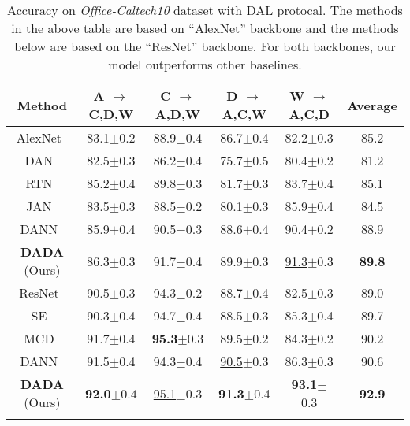 \documentclass{article}
\begin{document}
\begin{table*}[t]

    \addtolength{\tabcolsep}{1pt}
    \caption{Accuracy on \emph{Office-Caltech10} dataset with DAL protocal. The methods in the above table are based on ``AlexNet'' backbone and the methods below are based on the ``ResNet'' backbone. For both backbones, our model outperforms other baselines. } \label{table_office}
    \vspace{0.1in}
    \centering
    
    \label{table:office10}
    \begin{tabular}{cccccc}
        \Xhline{1pt}
        Method & A $\rightarrow$ C,D,W & C $\rightarrow$ A,D,W & D $\rightarrow$ A,C,W & W $\rightarrow$ A,C,D & Average \\
        \hline
        AlexNet~\cite{alexnet}& 83.1$\pm$0.2 & 88.9$\pm$0.4 & 86.7$\pm$0.4  & 82.2$\pm$0.3& 85.2 \\
        DAN~\cite{long2015} & 82.5$\pm$0.3 & 86.2$\pm$0.4& 75.7$\pm$0.5& 80.4$\pm$0.2 & 81.2 \\
        
        RTN~\cite{RTN} & 85.2$\pm$0.4 & 89.8$\pm$0.3 & 81.7$\pm$0.3& 83.7$\pm$0.4 & 85.1 \\
        JAN~\cite{JAN} & 83.5$\pm$0.3& 88.5$\pm$0.2 & 80.1$\pm$0.3& 85.9$\pm$0.4 & 84.5 \\
        DANN~\cite{DANN} & 85.9$\pm$0.4 & 90.5$\pm$0.3 & 88.6$\pm0.4$& 90.4$\pm$0.2& 88.9  \\
        \textbf{DADA} (Ours) & 86.3$\pm$0.3 &91.7$\pm$0.4 & 89.9$\pm$0.3 & \underline{91.3}$\pm$0.3 & \textbf{89.8}\\
        \Xhline{1pt}
        ResNet~\cite{resnet} & 90.5$\pm$0.3 & 94.3$\pm$0.2 & 88.7$\pm$0.4 &82.5$\pm$0.3 & 89.0\\
        SE~\cite{SE} & 90.3$\pm$0.4 & 94.7$\pm$0.4 & 88.5$\pm$0.3 & 85.3$\pm$0.4 & 89.7 \\
        MCD~\cite{MCD_2018} & 91.7$\pm$0.4 &\textbf{95.3}$\pm$0.3 & 89.5$\pm$0.2 & 84.3$\pm$0.2  & 90.2 \\ 
        DANN~\cite{DANN} & 91.5$\pm$0.4 &94.3$\pm$0.4&\underline{90.5}$\pm$0.3&86.3$\pm$0.3 & 90.6\\
\textbf{DADA} (Ours) &\textbf{92.0}$\pm0.4$& \underline{95.1}$\pm0.3$ & \textbf{91.3}$\pm$0.4& \textbf{93.1}$\pm$0.3&\textbf{92.9}\\
	     \hline
        
        \Xhline{1pt}
    \end{tabular}
    

\end{table*}
\end{document}
